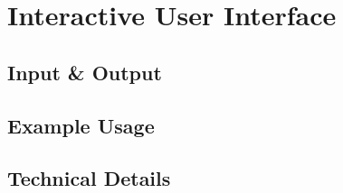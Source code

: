 \section{Interactive User Interface}

\subsection{Input \& Output}

\subsection{Example Usage}

\subsection{Technical Details}

\newpage
